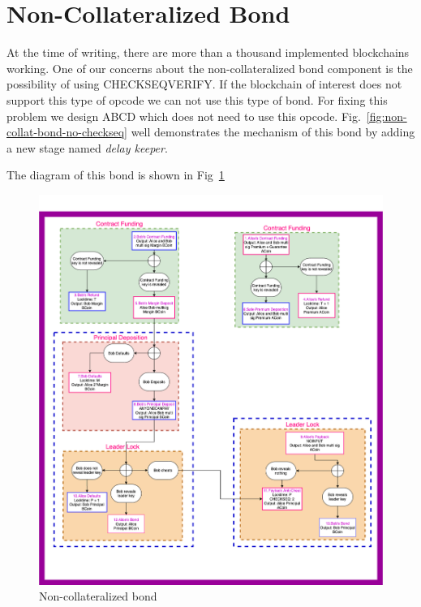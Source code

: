 \section{Non-Collateralized Bond}
\label{app:non-collat-bond}
At the time of writing, there are more than a thousand implemented blockchains working. One of our concerns about the non-collateralized bond component is the possibility of using CHECKSEQVERIFY. If the blockchain of interest does not support this type of opcode we can not use this type of bond. For fixing this problem we design ABCD which does not need to use this opcode. Fig.~\ref{fig:non-collat-bond-no-checkseq} well demonstrates the mechanism of this bond by adding a new stage named {\it delay keeper}.


The diagram of this bond is shown in Fig~\ref{fig:non-collat-bond} 
\begin{figure}
    \centering
    \includegraphics[width=\textwidth]{figures/non-collateralized-bond-checkseq.png}
    \caption{Non-collateralized bond}
    \label{fig:non-collat-bond}
\end{figure}


